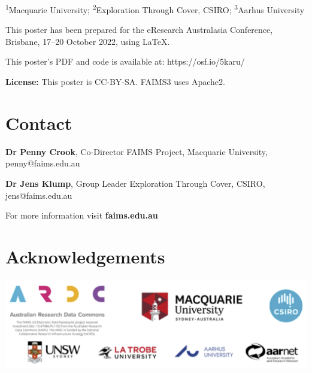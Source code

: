 \documentclass[a0,portrait]{a0poster}
\begin{document}
\begin{multicols}{3}




\textsuperscript{1}Macquarie University; \textsuperscript{2}Exploration Through Cover, CSIRO; \textsuperscript{3}Aarhus University 

\vfill

This poster has been prepared for the eResearch Australasia Conference, Brisbane, 17–20 October 2022, using \LaTeX{}.

\vfill

This poster's PDF and code is available at: https://osf.io/5karu/

\vfill

\textbf{License:} This poster is CC-BY-SA. FAIMS3 uses Apache2. 




\section*{Contact}
\begingroup
\setlength{\columnsep}{25pt}
\begin{figure}
\centering
\vspace{3.5mm}
\end{figure}


\textbf{Dr Penny Crook}, Co-Director FAIMS Project, Macquarie University, penny@faims.edu.au

\textbf{Dr Jens Klump}, Group Leader Exploration Through Cover, CSIRO, jens@faims.edu.au

For more information visit \textbf{faims.edu.au}
\endgroup

\columnbreak

\section*{Acknowledgements}

\begin{center}

\includegraphics[width=\linewidth]{figures/FAIMS-keypartners.png}
\end{center}

\end{multicols}
\end{document}
